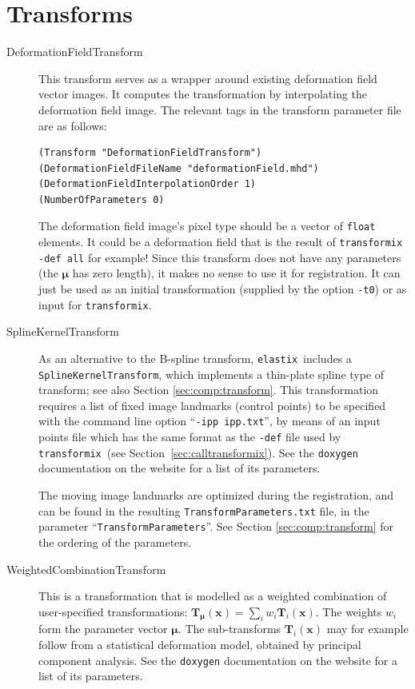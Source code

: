 \documentclass[]{report}
\newcommand{\elastix}{\texttt{elastix}}
\newcommand{\transformix}{\texttt{transformix}}
\newcommand{\vx}{\bm{x}}
\newcommand{\vmu}{\bm{\mu}}
\newcommand{\vT}{\bm{T}}
\newcommand{\vTm}{\bm{T}_{\vmu}}
\begin{document}
\section{Transforms}\label{sec:adv:transform}

\begin{description}
\item[DeformationFieldTransform] This transform serves as a wrapper around
    existing deformation field vector images. It computes the
    transformation by interpolating the deformation field image. The
    relevant tags in the transform parameter file are as follows:
\begin{verbatim}
(Transform "DeformationFieldTransform")
(DeformationFieldFileName "deformationField.mhd")
(DeformationFieldInterpolationOrder 1)
(NumberOfParameters 0)
\end{verbatim}
The deformation field image's pixel type should be a vector of
\texttt{float} elements. It could be a deformation field that is the
result of \texttt{transformix -def all} for example! Since this
transform does not have any parameters (the $\vmu$ has zero length),
it makes no sense to use it for registration. It can just be used as
an initial transformation (supplied by the option \texttt{-t0}) or
as input for \transformix.

\item[SplineKernelTransform] As an alternative to the B-spline transform,
\elastix\ includes a \texttt{SplineKernelTransform}, which
implements a thin-plate spline type of transform; see also Section
\ref{sec:comp:transform}. This transformation requires a list of
fixed image landmarks (control points) to be specified with the
command line option ``\texttt{-ipp ipp.txt}'', by means of an input
points file which has the same format as the \texttt{-def} file used
by \transformix\ (see Section~\ref{sec:calltransformix}). See the
\texttt{doxygen} documentation on the website for a list of its
parameters.

The moving image landmarks are optimized during the registration,
and can be found in the resulting \texttt{TransformParameters.txt}
file, in the parameter ``\texttt{TransformParameters}''. See Section
\ref{sec:comp:transform} for the ordering of the parameters.

\item[WeightedCombinationTransform] This is a transformation that is
    modelled as a weighted combination of user-specified transformations:
    $\vTm(\vx) = \sum_i w_i \vT_i(\vx)$. The weights $w_i$ form the
    parameter vector $\vmu$. The sub-transforms $\vT_i(\vx)$ may for
    example follow from a statistical deformation model, obtained by
    principal component analysis. See the \texttt{doxygen} documentation on
    the website for a list of its parameters.


\end{description}
\end{document}
